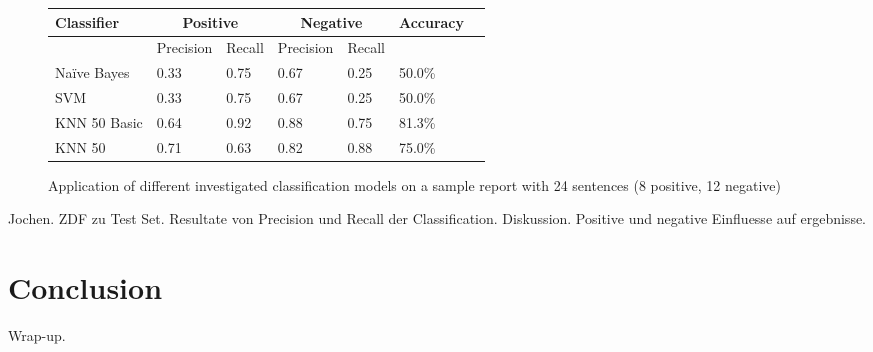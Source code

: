 \documentclass[11pt,titlepage,oneside,openany]{book}
\begin{document}
\begin{figure} [h!]
\centering
\begin{tabular}{ | l | l | l | l | l | l | l | }
\hline
	Classifier & \multicolumn{2}{|c|}{Positive} &  \multicolumn{2}{|c|}{Negative} & Accuracy \\ \hline
	& Precision & Recall & Precision & Recall & \  \\ \hline
	Na\"{i}ve Bayes & 0.33 & 0.75 & 0.67 & 0.25 & 50.0\% \\ \hline
	SVM & 0.33 & 0.75 & 0.67 & 0.25 & 50.0\% \\ \hline
	KNN 50 Basic & 0.64 & 0.92 & 0.88 & 0.75 & 81.3\% \\ \hline
	KNN 50  & 0.71 & 0.63 & 0.82 & 0.88 & 75.0\% \\ \hline
\end{tabular}
\caption{Application of different investigated classification models on a sample report with 24 sentences (8 positive, 12 negative)}
\label{fig.appliedmodel}
\end{figure}


Jochen. ZDF zu Test Set. Resultate von Precision und Recall der Classification. Diskussion. Positive und negative Einfluesse auf ergebnisse. 

\section{Conclusion}
Wrap-up.



\end{document}
